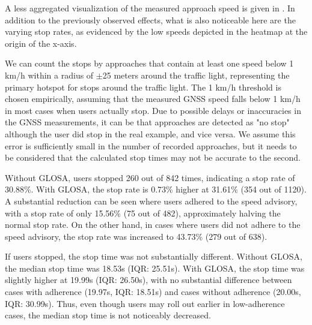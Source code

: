 A less aggregated visualization of the measured approach speed is given in . In addition to the previously observed effects, what is also noticeable here are the varying stop rates, as evidenced by the low speeds depicted in the heatmap at the origin of the x-axis. 

We can count the stops by approaches that contain at least one speed below 1 km/h within a radius of $\pm$25 meters around the traffic light, representing the primary hotspot for stops around the traffic light. The 1 km/h threshold is chosen empirically, assuming that the measured GNSS speed falls below 1 km/h in most cases when users actually stop. Due to possible delays or inaccuracies in the GNSS measurements, it can be that approaches are detected as "no stop" although the user did stop in the real example, and vice versa. We assume this error is sufficiently small in the number of recorded approaches, but it needs to be considered that the calculated stop times may not be accurate to the second.

Without GLOSA, users stopped 260 out of 842 times, indicating a stop rate of 30.88\%. With GLOSA, the stop rate is 0.73\% higher at 31.61\% (354 out of 1120). A substantial reduction can be seen where users adhered to the speed advisory, with a stop rate of only 15.56\% (75 out of 482), approximately halving the normal stop rate. On the other hand, in cases where users did not adhere to the speed advisory, the stop rate was increased to 43.73\% (279 out of 638).

If users stopped, the stop time was not substantially different. Without GLOSA, the median stop time was 18.53s (IQR: 25.51s). With GLOSA, the stop time was slightly higher at 19.99s (IQR: 26.50s), with no substantial difference between cases with adherence (19.97s, IQR: 18.51s) and cases without adherence (20.00s, IQR: 30.99s). Thus, even though users may roll out earlier in low-adherence cases, the median stop time is not noticeably decreased.

